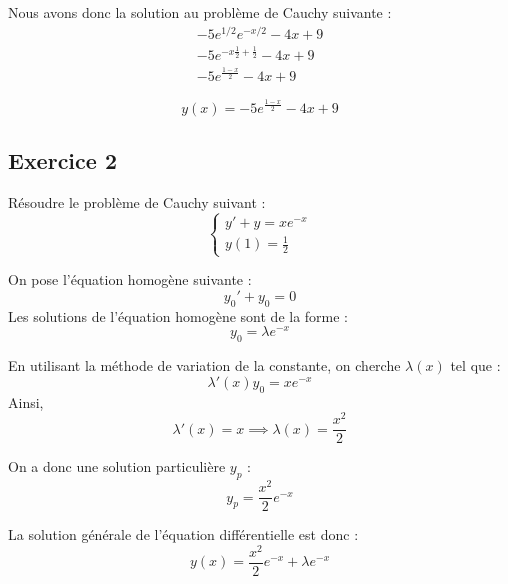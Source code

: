 \documentclass{article}
\begin{document}
Nous avons donc la solution au problème de Cauchy suivante :
\begin{equation*}
\begin{gathered}
 -5e^{1/2}e^{-x/2} -4x+9 \\
 -5e^{-x\frac{1}{2} + \frac{1}{2}} -4x+9 \\
 -5e^{\frac{1-x}{2}} -4x+9 
\end{gathered}
\end{equation*}

\begin{equation*}
y(x) = -5e^{\frac{1-x}{2}} -4x+9 
\end{equation*}

\subsection{Exercice 2}

Résoudre le problème de Cauchy suivant :
\begin{equation*}
\begin{cases}
y' + y = xe^{-x}\\
y(1)=\frac{1}{2}
\end{cases}
\end{equation*}

On pose l'équation homogène suivante :
\begin{equation*}
y_{0}' + y_{0} = 0
\end{equation*}
Les solutions de l'équation homogène sont de la forme :
\begin{equation*}
y_{0} = \lambda e^{-x}
\end{equation*}

En utilisant la méthode de variation de la constante, on cherche $\lambda(x)$ tel que :
\begin{equation*}
\lambda'(x)y_{0} = xe^{-x}
\end{equation*}
Ainsi,
\begin{equation*}
\lambda'(x) = x \implies \lambda(x) = \frac{x^2}{2}
\end{equation*}

On a donc une solution particulière $y_{p}$ :
\begin{equation*}
y_{p} = \frac{x^2}{2}e^{-x}
\end{equation*}

La solution générale de l'équation différentielle est donc :
\begin{equation*}
y(x) = \frac{x^2}{2}e^{-x} + \lambda e^{-x}
\end{equation*}
\end{document}
